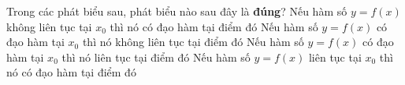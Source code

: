 \begin{ex}%
	Trong các phát biểu sau, phát biểu nào sau đây là  \textbf{đúng}?
	 \choice
		{Nếu hàm số $y=f(x)$ không  liên tục tại $x_0$ thì nó có đạo hàm tại điểm đó}
		{Nếu hàm số $y=f(x)$ có đạo hàm tại $x_0$ thì nó không liên tục tại  điểm đó}
		{\True Nếu hàm số $y=f(x)$ có đạo hàm tại $x_0$  thì nó liên tục tại điểm đó}
		{Nếu hàm số $y=f(x)$ liên tục tại $x_0$ thì nó có  đạo hàm tại điểm đó}
\end{ex}
